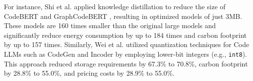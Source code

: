 For instance, Shi et al. \cite{shi2024greening} applied knowledge distillation to reduce the size of CodeBERT \cite{feng2020codebert} and GraphCodeBERT \cite{guo2020graphcodebert}, resulting in optimized models of just 3MB. These models are 160 times smaller than the original large models and significantly reduce energy consumption by up to 184 times and carbon footprint by up to 157 times. Similarly, Wei et al. \cite{wei2023towards} utilized quantization techniques for Code LLMs such as CodeGen \cite{nijkamp2022codegen} and Incoder \cite{fried2022incoder} by employing lower-bit integers (e.g., \texttt{int8}). This approach reduced storage requirements by 67.3\% to 70.8\%, carbon footprint by 28.8\% to 55.0\%, and pricing costs by 28.9\% to 55.0\%.

